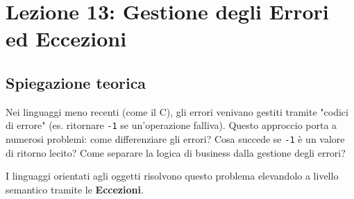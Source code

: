 \documentclass[12pt, a4paper]{article}
\begin{document}
\section{Lezione 13: Gestione degli Errori ed Eccezioni}

\subsection{Spiegazione teorica}
Nei linguaggi meno recenti (come il C), gli errori venivano gestiti tramite "codici di errore" (es. ritornare \texttt{-1} se un'operazione falliva). Questo approccio porta a numerosi problemi: come differenziare gli errori? Cosa succede se \texttt{-1} è un valore di ritorno lecito? Come separare la logica di business dalla gestione degli errori?

I linguaggi orientati agli oggetti risolvono questo problema elevandolo a livello semantico tramite le \textbf{Eccezioni}.
\end{document}
